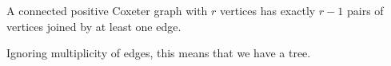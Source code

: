 A connected positive Coxeter graph with $r$ vertices has exactly $r-1$ pairs
of vertices joined by at least one edge.

Ignoring multiplicity of edges, this means that we have a tree.
